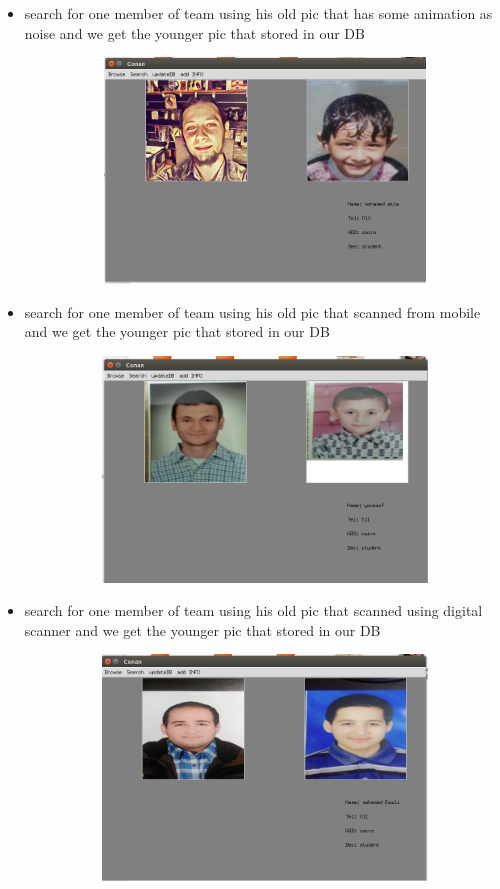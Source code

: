 \documentclass[pdftex,10pt,a4paper,oneside]{article}
\begin{document}
\begin{itemize}
		\item search for one member of team  using his old pic that has some animation as noise and we get the younger pic that stored in our DB 
	\begin{figure}[H]
	\centering
	\includegraphics[width=120mm,height=60mm]{fig/18.png}
\end{figure}
\pagebreak
	\item search for one member of team  using his old pic that scanned from mobile and we get the younger pic that stored in our DB
	\begin{figure}[H]
	\centering
	\includegraphics[width=120mm,height=60mm]{fig/14.png}
\end{figure}
	\item search for one member of team  using his old pic that scanned using digital scanner and we get the younger pic that stored in our DB
			\begin{figure}[H]
			\centering
			\includegraphics[width=120mm,height=60mm]{fig/15.png}

\end{figure}
\end{itemize}
\end{document}
